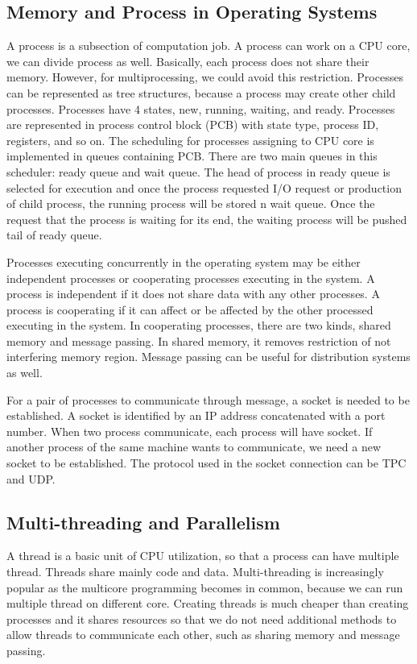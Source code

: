 \subsection{Memory and Process in Operating Systems}
\label{sec:os_mem_process}
A process is a subsection of computation job. A process can work on a CPU core, we can divide process as well.
Basically, each process does not share their memory. However, for multiprocessing, we could avoid this restriction.
Processes can be represented as tree structures, because a process may create other child processes.
Processes have 4 states, new, running, waiting, and ready. 
Processes are represented in process control block (PCB) with state type, process ID, registers, and so on.
The scheduling for processes assigning to CPU core is implemented in queues containing PCB. There are two main queues in this scheduler: 
ready queue and wait queue. The head of process in ready queue is selected for execution and once the process requested I/O request or 
production of child process, the running process will be stored n wait queue. Once the request that the process is waiting for its end, 
the waiting process will be pushed tail of ready queue. 

Processes executing concurrently in the operating system may be either independent processes or cooperating processes executing in the system.
A process is independent if it does not share data with any other processes. A process is cooperating if it can affect or be affected by the 
other processed executing in the system. In cooperating processes, there are two kinds, shared memory and message passing. 
In shared memory, it removes restriction of not interfering memory region. Message passing can be useful for distribution systems as well.

For a pair of processes to communicate through message, a socket is needed to be established. 
A socket is identified by an IP address concatenated with a port number. When two process communicate, each process will have socket. 
If another process of the same machine wants to communicate, we need a new socket to be established. The protocol used in the socket connection
can be TPC and UDP.

\subsection{Multi-threading and Parallelism}
\label{sec:os_thread}
A thread is a basic unit of CPU utilization, so that a process can have multiple thread. Threads share mainly code and data. 
Multi-threading is increasingly popular as the multicore programming becomes in common, because we can run multiple thread on different core.
Creating threads is much cheaper than creating processes and it shares resources so that we do not need additional methods to allow threads to 
communicate each other, such as sharing memory and message passing.

